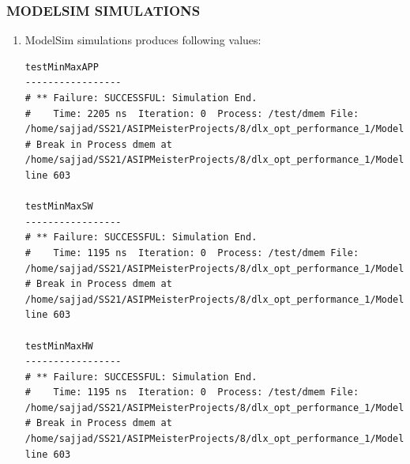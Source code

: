 \subsubsection{MODELSIM SIMULATIONS}
\begin{enumerate}[resume]
\item ModelSim simulations produces following values:
\begin{lstlisting}
testMinMaxAPP
-----------------
# ** Failure: SUCCESSFUL: Simulation End.
#    Time: 2205 ns  Iteration: 0  Process: /test/dmem File: /home/sajjad/SS21/ASIPMeisterProjects/8/dlx_opt_performance_1/ModelSim/tb_browstd32.vhd
# Break in Process dmem at /home/sajjad/SS21/ASIPMeisterProjects/8/dlx_opt_performance_1/ModelSim/tb_browstd32.vhd line 603

testMinMaxSW 
-----------------
# ** Failure: SUCCESSFUL: Simulation End.
#    Time: 1195 ns  Iteration: 0  Process: /test/dmem File: /home/sajjad/SS21/ASIPMeisterProjects/8/dlx_opt_performance_1/ModelSim/tb_browstd32.vhd
# Break in Process dmem at /home/sajjad/SS21/ASIPMeisterProjects/8/dlx_opt_performance_1/ModelSim/tb_browstd32.vhd line 603

testMinMaxHW 
-----------------
# ** Failure: SUCCESSFUL: Simulation End.
#    Time: 1195 ns  Iteration: 0  Process: /test/dmem File: /home/sajjad/SS21/ASIPMeisterProjects/8/dlx_opt_performance_1/ModelSim/tb_browstd32.vhd
# Break in Process dmem at /home/sajjad/SS21/ASIPMeisterProjects/8/dlx_opt_performance_1/ModelSim/tb_browstd32.vhd line 603
\end{lstlisting}
\end{enumerate}